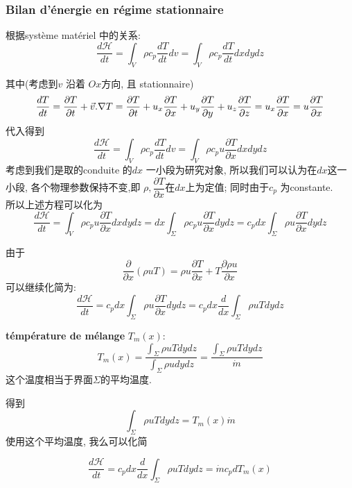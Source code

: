 \documentclass{article}
\begin{document}
\subsubsection{Bilan d'\'energie en r\'egime stationnaire}
根据syst\`eme mat\'eriel 中的关系:
\begin{equation}
\dfrac{d \mathcal{H}}{dt}
= \int_V \rho c_p\frac{dT}{dt}dv
= \int_V \rho c_p\frac{dT}{dt}dxdydz
\end{equation}

其中(考虑到$v$ 沿着 $Ox$方向, 且 stationnaire)
$$
\dfrac{dT}{dt}
= \frac{\partial T}{\partial t} + \vec{v} . \nabla T
= \frac{\partial T}{\partial t} + u_x \frac{\partial T}{\partial x} + u_y \frac{\partial T}{\partial y} + u_z \frac{\partial T}{\partial z}
= u_x \frac{\partial T}{\partial x}
= u \frac{\partial T}{\partial x}
$$
代入\lasteq 得到
\begin{equation}
\dfrac{d \mathcal{H}}{dt}
= \int_V \rho c_p\frac{dT}{dt}dv
= \int_V \rho c_p u \frac{\partial T}{\partial x} dxdydz
\end{equation}
考虑到我们是取的conduite 的$dx$ 一小段为研究对象, 所以我们可以认为在$dx$这一小段, 各个物理参数保持不变,即 $\rho, \dfrac{\partial T}{\partial x}$在$dx$上为定值; 同时由于$c_p$ 为constante.\\
所以上述方程\lasteq 可以化为
\begin{equation}
\dfrac{d \mathcal{H}}{dt}
= \int_V \rho c_p u \frac{\partial T}{\partial x} dxdydz
= dx \int_\Sigma \rho c_p u \frac{\partial T}{\partial x} dydz
= c_p dx \int_\Sigma \rho u \frac{\partial T}{\partial x} dydz
\end{equation}

由于
$$
\frac{\partial}{\partial x}(\rho u T)
= \rho u \frac{\partial T}{\partial x} + T \frac{\partial \rho u}{\partial x}
$$
\lasteq 可以继续化简为:
\begin{equation}
\dfrac{d \mathcal{H}}{dt}
= c_p dx \int_\Sigma \rho u \frac{\partial T}{\partial x} dydz
= c_p dx \dfrac{d}{dx}\int_\Sigma \rho u T dydz
\end{equation}

\textbf{t\'emp\'erature de m\'elange} $T_m(x)$:
$$
T_m(x) 
= \dfrac{\int_\Sigma \rho u T dydz}{\int_\Sigma \rho u dydz}
= \dfrac{\int_\Sigma \rho u T dydz}{\dot{m}}
$$
这个温度相当于界面$\Sigma$的平均温度.

得到
$$\int_\Sigma \rho u T dydz = T_m(x) \dot{m} $$
使用这个平均温度, 我么可以化简\lasteq

\begin{equation}
\dfrac{d \mathcal{H}}{dt}
= c_p dx \dfrac{d}{dx}\int_\Sigma \rho u T dydz
= \dot{m} c_p dT_m(x)
\end{equation}
\end{document}
